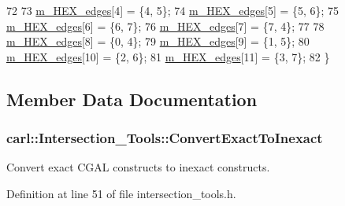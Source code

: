 \begin{DoxyCode}
72 
73     \hyperlink{classcarl_1_1_intersection___tools_a418dc03e4edc3f5bba1f78f6fc5afe71}{m\_HEX\_edges}[4] = \{4, 5\};
74     \hyperlink{classcarl_1_1_intersection___tools_a418dc03e4edc3f5bba1f78f6fc5afe71}{m\_HEX\_edges}[5] = \{5, 6\};
75     \hyperlink{classcarl_1_1_intersection___tools_a418dc03e4edc3f5bba1f78f6fc5afe71}{m\_HEX\_edges}[6] = \{6, 7\};
76     \hyperlink{classcarl_1_1_intersection___tools_a418dc03e4edc3f5bba1f78f6fc5afe71}{m\_HEX\_edges}[7] = \{7, 4\};
77 
78     \hyperlink{classcarl_1_1_intersection___tools_a418dc03e4edc3f5bba1f78f6fc5afe71}{m\_HEX\_edges}[8]  = \{0, 4\};
79     \hyperlink{classcarl_1_1_intersection___tools_a418dc03e4edc3f5bba1f78f6fc5afe71}{m\_HEX\_edges}[9]  = \{1, 5\};
80     \hyperlink{classcarl_1_1_intersection___tools_a418dc03e4edc3f5bba1f78f6fc5afe71}{m\_HEX\_edges}[10] = \{2, 6\};
81     \hyperlink{classcarl_1_1_intersection___tools_a418dc03e4edc3f5bba1f78f6fc5afe71}{m\_HEX\_edges}[11] = \{3, 7\};
82 \}
\end{DoxyCode}


\subsection{Member Data Documentation}
\hypertarget{classcarl_1_1_intersection___tools_a8cd632ee9314f5981c620af325245413}{}
\subsubsection[{Convert\+Exact\+To\+Inexact}]{ carl\+::\+Intersection\+\_\+\+Tools\+::\+Convert\+Exact\+To\+Inexact\hspace{0.3cm}{\ttfamily [protected]}}\label{classcarl_1_1_intersection___tools_a8cd632ee9314f5981c620af325245413}


Convert exact C\+G\+A\+L constructs to inexact constructs. 



Definition at line 51 of file intersection\+\_\+tools.\+h.

\hypertarget{classcarl_1_1_intersection___tools_a89118c79160362561c0cf7f1743568a6}{}
